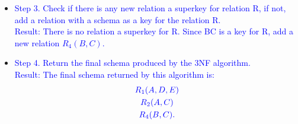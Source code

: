 \documentclass{article}
\begin{document}
\begin{enumerate}
\begin{enumerate}
\begin{itemize}[label=\textcolor{blue}{\textbullet}]
            \item \textcolor{blue}{Step 3. } \textcolor{blue}{Check if there is any new relation a superkey for relation R, if not, add a relation with a schema as a key for the relation R.}\\
            \textcolor{blue}{Result: }
            \textcolor{blue}{There is no relation a superkey for R. Since BC is a key for R, add a new relation $R_4(B, C)$.}\\
            \item \textcolor{blue}{Step 4. } \textcolor{blue}{Return the final schema produced by the 3NF algorithm.}\\
            \textcolor{blue}{Result: } \textcolor{blue}{The final schema returned by this algorithm is: }
            \begin{gather*}
                \textcolor{blue}{R_1(A, D, E)}\\
                \textcolor{blue}{R_2(A, C)}\\
                \textcolor{blue}{R_4(B, C).}
            \end{gather*}
        \end{itemize}
    \end{enumerate}
\end{enumerate}
\end{document}
